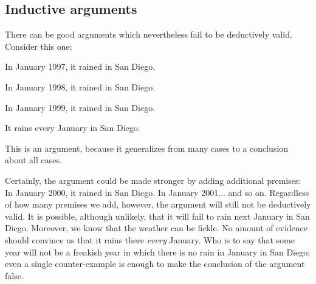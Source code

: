 




\subsection{Inductive arguments}

There can be good arguments which nevertheless fail to be deductively valid. Consider this one:

\begin{earg}
\item[] In January 1997, it rained in San Diego.
\item[] In January 1998, it rained in San Diego.
\item[] In January 1999, it rained in San Diego.
\item[\therefore] It rains every January in San Diego.
\end{earg}

This is an  argument, because it generalizes from many cases to a conclusion about all cases.

Certainly, the argument could be made stronger by adding additional premises: In January 2000, it rained in San Diego. In January 2001$\ldots$ and so on. Regardless of how many premises we add, however, the argument will still not be deductively valid. It is possible, although unlikely, that it will fail to rain next January in San Diego. Moreover, we know that the weather can be fickle. No amount of evidence should convince us that it rains there \emph{every} January. Who is to say that some year will not be a freakish year in which there is no rain in January in San Diego; even a single counter-example is enough to make the conclusion of the argument false.

